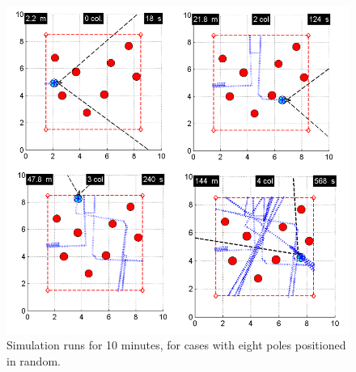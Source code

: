 \begin{figure}[h]
\includegraphics[width=1\linewidth]{Figures/Simulation_8Poles.png}
\centering
\caption{Simulation runs for 10 minutes, for cases with eight poles positioned in random.}
\label{f:Simulation_8Poles}
\end{figure}


